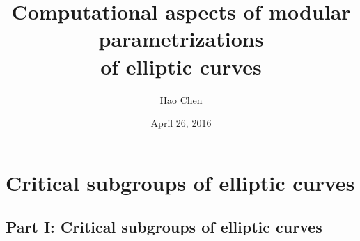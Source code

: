 \documentclass[handout]{beamer}
\title[thesis defense]{Computational aspects of modular parametrizations \\ of elliptic curves} %
\author{Hao Chen} %
\institute[UW] %
{
\large{University of Washington Ph.D. defense} \\ %
\medskip
\large{Advisor: William Stein} %
}
\date{April 26, 2016} %
\begin{document}
\begin{frame}
\titlepage %
\end{frame}


%



\section{Critical subgroups of elliptic curves} %


\subsection{Part I: Critical subgroups of elliptic curves}
\end{document}
